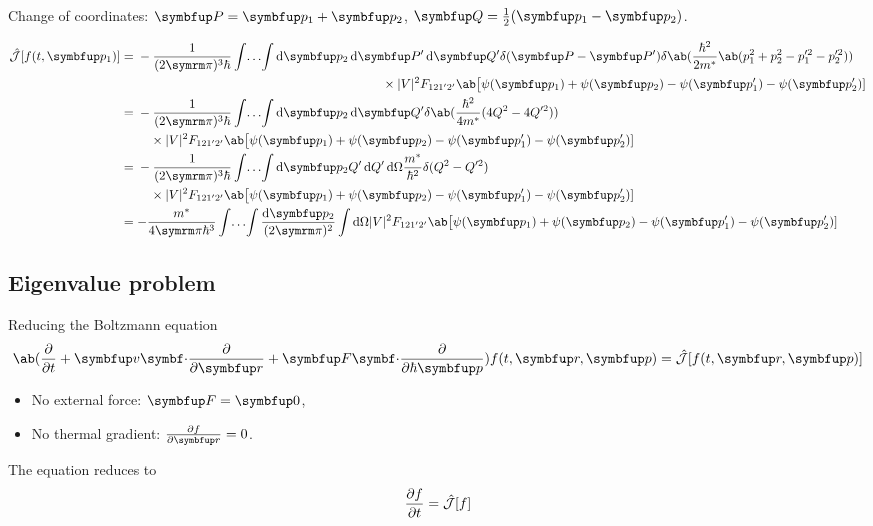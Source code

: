 \begin{frame}
  Change of coordinates: \(\vv{P} = \vv{p}_1 + \vv{p}_2\), \(\vv{Q} = \frac{1}{2}(\vv{p}_1 - \vv{p}_2)\).

  \begin{align*}
    \hat{\mathcal{J}}[f(t, \vv{p}_1)]
     & = \begin{multlined}[t]
           -\frac{1}{(2\cpi)^3\hbar} \dotsint \odif{\vv{p}_2,\vv{P}',\vv{Q}'}
           \delta(\vv{P} - \vv{P}') \delta\ab(\frac{\hbar^2}{2 m^*} \ab(p_1^2 + p_2^2 - p_1'^2 - p_2'^2)) \\
           \times |V|^2 F_{121'2'}\ab\big[\psi(\vv{p}_1) + \psi(\vv{p}_2) - \psi(\vv{p}_1') - \psi(\vv{p}_2')]
         \end{multlined} \nonumber \\
     & = \begin{multlined}[t]
           - \frac{1}{(2\cpi)^3\hbar} \dotsint \odif{\vv{p}_2,\vv{Q'}}
           \delta\ab(\frac{\hbar^2}{4m^*}(4Q^2 - 4Q'^2)) \\
           \times |V|^2 F_{121'2'}\ab\big[\psi(\vv{p}_1) + \psi(\vv{p}_2) - \psi(\vv{p}_1') - \psi(\vv{p}_2')]
         \end{multlined} \\
     & = \begin{multlined}[t]
           - \frac{1}{(2\cpi)^3\hbar} \dotsint \odif{\vv{p}_2} Q' \odif{Q',\Omega} \frac{m^*}{\hbar^2}\delta(Q^2 - Q'^2) \\
           \times |V|^2 F_{121'2'}\ab\big[\psi(\vv{p}_1) + \psi(\vv{p}_2) - \psi(\vv{p}_1') - \psi(\vv{p}_2')]
         \end{multlined} \\
     & = -\frac{m^*}{4\cpi\hbar^3} \dotsint \frac{\odif{\vv{p}_2}}{(2\cpi)^2} \int \odif{\Omega}
    |V|^2 F_{121'2'}\ab\big[\psi(\vv{p}_1) + \psi(\vv{p}_2) - \psi(\vv{p}_1') - \psi(\vv{p}_2')]
  \end{align*}
\end{frame}

\subsection{Eigenvalue problem}

\begin{frame}{Reducing the Boltzmann equation}
  \begin{equation}
    \ab(\pdv{}{t} + \vv{v} \vdot \pdv{}{\vv{r}} + \vv{F} \vdot \pdv{}{\hbar \vv{p}}) f(t, \vv{r}, \vv{p})
    = \hat{\mathcal{J}}[f(t, \vv{r}, \vv{p})]
  \end{equation}

  \begin{itemize}
    \item No external force: \(\vv{F} = \vv{0}\),
    \item No thermal gradient: \(\pdv{f}{\vv{r}} = 0\).
  \end{itemize}

  The equation reduces to
  \begin{equation}
    \pdv{f}{t} = \hat{\mathcal{J}}[f]
  \end{equation}
\end{frame}

